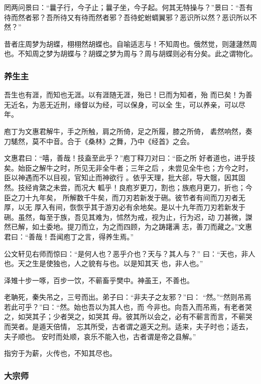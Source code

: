 \documentclass[]{article}
\begin{document}
罔两问景曰：``曩子行，今子止；曩子坐，今子起。何其无特操与？''景曰：``吾有待而然者邪？吾所待又有待而然者邪？吾待蛇蚹蜩翼邪？恶识所以然？恶识所以不然？''

昔者庄周梦为胡蝶，栩栩然胡蝶也。自喻适志与！不知周也。俄然觉，则蘧蘧然周也。不知周之梦为胡蝶与？胡蝶之梦为周与？周与胡蝶则必有分矣。此之谓物化。

\hypertarget{header-n555}{%
\subsubsection{养生主}\label{header-n555}}

吾生也有涯，而知也无涯。以有涯随无涯，殆已！已而为知者，殆
而已矣！为善无近名，为恶无近刑，缘督以为经，可以保身，可以全
生，可以养亲，可以尽年。

庖丁为文惠君解牛，手之所触，肩之所倚，足之所履，膝之所倚，
砉然响然，奏刀騞然，莫不中音。合于《桑林》之舞，乃中《经首》之会。

文惠君曰：``嘻，善哉！技盍至此乎？''庖丁释刀对曰：``臣之所
好者道也，进乎技矣。始臣之解牛之时，所见无非全牛者；三年之后
，未尝见全牛也；方今之时，臣以神遇而不以目视，官知止而神欲行
。依乎天理，批大郤，导大髋，因其固然。技经肯綮之未尝，而况大
軱乎！良庖岁更刀，割也；族庖月更刀，折也；今臣之刀十九年矣，
所解数千牛矣，而刀刃若新发于硎。彼节者有间而刀刃者无厚，以无
厚入有间，恢恢乎其于游刃必有余地矣。是以十九年而刀刃若新发于
硎。虽然，每至于族，吾见其难为，怵然为戒，视为止，行为迟，动
刀甚微，謋然已解，如土委地。提刀而立，为之而四顾，为之踌躇满
志，善刀而藏之。''文惠君曰：``善哉！吾闻庖丁之言，得养生焉。''

公文轩见右师而惊曰：``是何人也？恶乎介也？天与？其人与？''
曰：``天也，非人也。天之生是使独也，人之貌有与也。以是知其天
也，非人也。''

泽雉十步一啄，百步一饮，不蕲畜乎樊中。神虽王，不善也。

老聃死，秦失吊之，三号而出。弟子曰：``非夫子之友邪？''曰：
``然。''``然则吊焉若此可乎？''曰：``然。始也吾以为其人也，而
今非也。向吾入而吊焉，有老者哭之，如哭其子；少者哭之，如哭其
母。彼其所以会之，必有不蕲言而言，不蕲哭而哭者。是遁天倍情，
忘其所受，古者谓之遁天之刑。适来，夫子时也；适去，夫子顺也。
安时而处顺，哀乐不能入也，古者谓是帝之县解。''

指穷于为薪，火传也，不知其尽也。

\hypertarget{header-n566}{%
\subsubsection{大宗师}\label{header-n566}}
\end{document}
